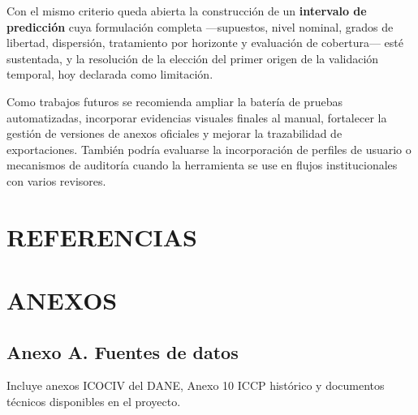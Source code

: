 \documentclass[12pt,letterpaper]{article}
\newcommand{\ICOCIV}{ICOCIV}
\newcommand{\ICCP}{ICCP}
\newcommand{\DANE}{DANE}
\begin{document}
Con el mismo criterio queda abierta la construcción de un \textbf{intervalo de predicción} cuya formulación completa ---supuestos, nivel nominal, grados de libertad, dispersión, tratamiento por horizonte y evaluación de cobertura--- esté sustentada, y la resolución de la elección del primer origen de la validación temporal, hoy declarada como limitación.

Como trabajos futuros se recomienda ampliar la batería de pruebas automatizadas, incorporar evidencias visuales finales al manual, fortalecer la gestión de versiones de anexos oficiales y mejorar la trazabilidad de exportaciones. También podría evaluarse la incorporación de perfiles de usuario o mecanismos de auditoría cuando la herramienta se use en flujos institucionales con varios revisores.

\newpage
\section{REFERENCIAS}



\newpage
\section{ANEXOS}

\subsection{Anexo A. Fuentes de datos}

Incluye anexos \ICOCIV{} del \DANE, Anexo 10 \ICCP{} histórico y documentos técnicos disponibles en el proyecto.
\end{document}
